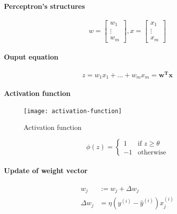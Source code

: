 \documentclass{article}
\begin{document}
			\paragraph{Perceptron's structures}
			\begin{equation*}
				w = \begin{bmatrix}
						w_1 \\
						\vdots \\
						w_m
					\end{bmatrix}, x =
					\begin{bmatrix}
						x_1 \\
						\vdots \\
						x_m
					\end{bmatrix}
			\end{equation*}

			\paragraph{Ouput equation}
			\begin{equation*}
				z = w_1 x_1 + \dots + w_m x_m = \boldsymbol{w^T x}
			\end{equation*}


			\paragraph{Activation function}

			\begin{figure}
				\centering
				\texttt{[image: activation-function]}
				\caption{Activation function}
				\label{fig:activation-function}
			\end{figure}

			\begin{equation*}
				\phi(z) = \begin{cases}
					1 &\mbox{if } z \geq \theta \\
					-1 &\mbox{otherwise}
				\end{cases}
			\end{equation*}

			\paragraph{Update of weight vector}

			\begin{align*}
					w_j &:= w_j + \Delta w_j \\
					\Delta w_j &= \eta(y^{(i)} - \hat{y}^{(i)}) x^{(i)}_j
			\end{align*}
\end{document}

